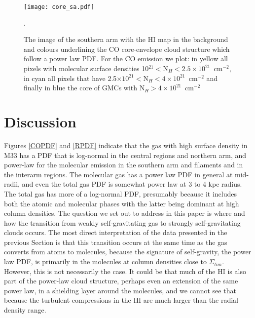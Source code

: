 \documentclass{aa}
\begin{document}
\begin{figure}
\centering
\texttt{[image: core\_sa.pdf]}
\caption{The image of the southern arm with the HI map in the background and  colours underlining the  CO core-envelope
cloud structure which follow a  power law PDF. For the  CO emission we plot:
in yellow all pixels with molecular surface densities
10$^{21}<$N$_H<2.5\times 10^{21}$~cm$^{-2}$, in cyan all pixels that have 2.5$\times 10^{21}<$N$_H<4\times 10^{21}$~cm$^{-2}$
and finally in blue the core of GMCs with  N$_H>4\times 10^{21}$~cm$^{-2}$}.
\label{core}
\end{figure}

\section{Discussion}
\label{models}

 Figures \ref{COPDF} and \ref{RPDF} indicate that the gas with high surface
density in M33 has a PDF that is log-normal in the central regions and northern
arm, and power-law for the molecular emission in the southern arm and filaments
and in the interarm regions. The molecular gas has a power law PDF in general at
mid-radii, and even the total gas PDF is somewhat power law at 3 to 4 kpc radius.
The total gas has more of a log-normal PDF,  presumably because it includes
both the atomic and  molecular phases with the latter being dominant at high
column densities.
The question we set out to address in this paper is where and how the transition
from weakly self-gravitating gas to strongly self-gravitating clouds occurs.  The
most direct interpretation of the data presented in the previous Section is that
this transition occurs at the same time as the gas converts from atoms to
molecules, because the signature of self-gravity, the power law PDF, is primarily
in the molecules at column densities close to $\Sigma_{lim}$. However, this is not
necessarily the case. It could be that much of the HI is also part of the
power-law cloud structure, perhaps even an extension of the same power law, in a
shielding layer around the molecules, and we cannot see that because the turbulent
compressions in the HI are much larger than the radial density range.
\end{document}
